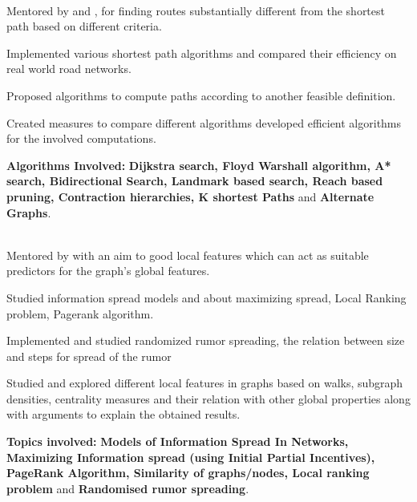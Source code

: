 \documentclass[a4paper]{norm-resume} %
\begin{document}
	\vspace{1mm}
	
				
	
\vspace{-1mm} %

	\begin{changemargin}{1.0cm}{0.0cm} 
	{
	\large{}  \\
	\small{Mentored by  and , for finding routes substantially different from the shortest path based on different criteria.} 
	\begin{tightitemize}
	\small
	{
	\item Implemented various shortest path algorithms and compared their efficiency on real world road networks.
	\item Proposed algorithms to compute paths according to another feasible definition.
	\item Created measures to compare different algorithms developed efficient algorithms for the involved computations.
	\item \textbf{Algorithms Involved:} \textbf{Dijkstra search, Floyd Warshall algorithm, A* search, Bidirectional Search, Landmark based search, Reach based pruning, Contraction hierarchies, K shortest Paths} and \textbf{Alternate Graphs}.
	}
	\end{tightitemize}
	
\vspace{1mm} %
			
	\large{} \\
	\small{Mentored by  with an aim to good local features which can act as suitable predictors for the graph's global features.}
	\begin{tightitemize}
	\small
	{
	\item Studied information spread models and about maximizing spread, Local Ranking problem, Pagerank algorithm. 
	\item Implemented and studied randomized rumor spreading, the relation between size and steps for spread of the rumor
	\item Studied and explored different local features in graphs based on walks, subgraph densities, centrality measures and their relation with other global properties along with arguments to explain the obtained results.
	\item \textbf{Topics involved:} \textbf{Models of Information Spread In Networks, Maximizing Information spread (using Initial Partial Incentives), PageRank Algorithm, Similarity of graphs/nodes, Local ranking problem} and \textbf{Randomised rumor spreading}.
	}
	\end{tightitemize}
 	
	}
	\end{changemargin} 	
\end{document}

